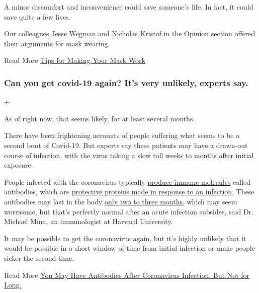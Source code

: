A minor discomfort and inconvenience could save someone's life. In fact,
it could save quite a few lives.

Our colleagues
\href{https://www.nytimes3xbfgragh.onion/2020/07/02/opinion/coronavirus-masks.html}{Jesse
Wegman} and
\href{https://www.nytimes3xbfgragh.onion/2020/07/01/opinion/coronavirus-face-masks.html?action=click\&module=RelatedLinks\&pgtype=Article}{Nicholas
Kristof} in the Opinion section offered their arguments for mask
wearing.

 Read More
\href{https://www.nytimes3xbfgragh.onion/interactive/2020/06/25/burst/how-to-get-the-most-out-of-your-mask.html}{Tips
for Making Your Mask Work}

\hypertarget{can-you-get-covid-19-again-its-very-unlikely-experts-say}{%
\subsubsection{Can you get covid-19 again? It's very unlikely, experts
say.}\label{can-you-get-covid-19-again-its-very-unlikely-experts-say}}

+

As of right now, that seems likely, for at least several months.

There have been frightening accounts of people suffering what seems to
be a second bout of Covid-19. But experts say these patients may have a
drawn-out course of infection, with the virus taking a slow toll weeks
to months after initial exposure.

People infected with the coronavirus typically
\href{https://www.nature.com/articles/s41586-020-2456-9}{produce immune
molecules} called antibodies, which are
\href{https://www.nytimes3xbfgragh.onion/2020/05/07/health/coronavirus-antibody-prevalence.html}{protective
proteins made in response to an infection.} These antibodies may last in
the body \href{https://www.nature.com/articles/s41591-020-0965-6}{only
two to three months,} which may seem worrisome, but that's perfectly
normal after an acute infection subsides, said Dr. Michael Mina, an
immunologist at Harvard University.

It may be possible to get the coronavirus again, but it's highly
unlikely that it would be possible in a short window of time from
initial infection or make people sicker the second time.

 Read More
\href{https://www.nytimes3xbfgragh.onion/2020/07/22/health/covid-antibodies-herd-immunity.html}{You
May Have Antibodies After Coronavirus Infection. But Not for Long.}

